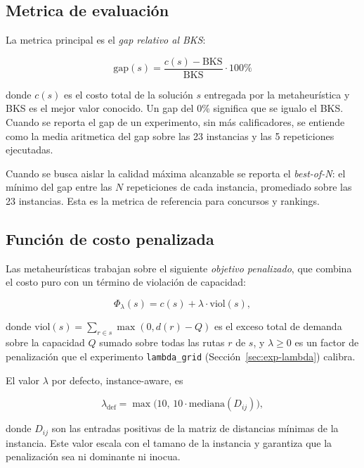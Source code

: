 \documentclass[11pt,a4paper]{article}
\theoremstyle{definition}
\theoremstyle{remark}
\newcommand{\BKS}{\text{BKS}}
\newcommand{\gap}{\text{gap}}
\newcommand{\viol}{\text{viol}}
\begin{document}
\subsection{Metrica de evaluación}
\label{sec:metrica}

La metrica principal es el \emph{gap relativo al BKS}:

\begin{equation}
\gap(s) = \frac{c(s) - \BKS}{\BKS} \cdot 100\%
\label{eq:gap}
\end{equation}

donde $c(s)$ es el costo total de la solución $s$ entregada por la
metaheurística y BKS es el mejor valor conocido. Un gap del 0\%
significa que se igualo el BKS. Cuando se reporta el gap de un
experimento, sin más calificadores, se entiende como la media
aritmetica del gap sobre las 23 instancias y las 5 repeticiones
ejecutadas.

Cuando se busca aislar la calidad máxima alcanzable se reporta el
\emph{best-of-N}: el mínimo del gap entre las $N$ repeticiones de cada
instancia, promediado sobre las 23 instancias. Esta es la metrica de
referencia para concursos y rankings.

\subsection{Función de costo penalizada}
\label{sec:costo-penalizado}

Las metaheurísticas trabajan sobre el siguiente \emph{objetivo
penalizado}, que combina el costo puro con un término de violación de
capacidad:

\begin{equation}
\Phi_\lambda(s) = c(s) + \lambda \cdot \viol(s),
\label{eq:objetivo}
\end{equation}

donde $\viol(s) = \sum_{r \in s} \max(0, d(r) - Q)$ es el exceso total
de demanda sobre la capacidad $Q$ sumado sobre todas las rutas $r$ de
$s$, y $\lambda \ge 0$ es un factor de penalización que el experimento
\texttt{lambda\_grid} (Sección~\ref{sec:exp-lambda}) calibra.

El valor $\lambda$ por defecto, instance-aware, es

\begin{equation}
\lambda_{\text{def}} = \max\bigl(10, \, 10 \cdot \mathrm{mediana}(D_{ij})\bigr),
\label{eq:lambda-def}
\end{equation}

donde $D_{ij}$ son las entradas positivas de la matriz de distancias
mínimas de la instancia. Este valor escala con el tamano de la
instancia y garantiza que la penalización sea ni dominante ni
inocua.
\end{document}
